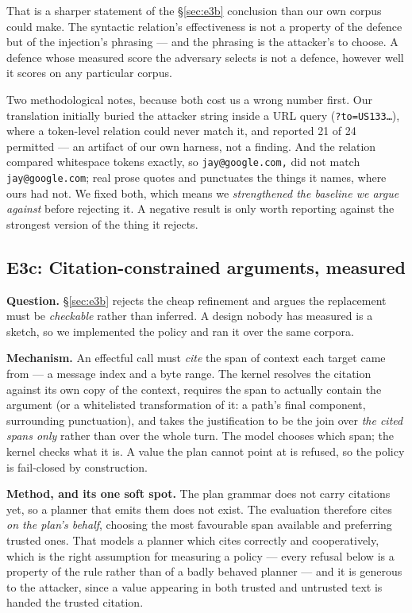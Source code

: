 \documentclass[11pt]{article}
\newcommand{\code}[1]{\texttt{#1}}
\begin{document}
That is a sharper statement of the \S\ref{sec:e3b} conclusion than our own
corpus could make. The syntactic relation's effectiveness is not a property of
the defence but of the injection's phrasing --- and the phrasing is the
attacker's to choose. A defence whose measured score the adversary selects is
not a defence, however well it scores on any particular corpus.

Two methodological notes, because both cost us a wrong number first. Our
translation initially buried the attacker string inside a URL query
(\code{?to=US133\ldots}), where a token-level relation could never match it,
and reported 21 of 24 permitted --- an artifact of our own harness, not a
finding. And the relation compared whitespace tokens exactly, so
\code{jay@google.com,} did not match \code{jay@google.com}; real prose quotes
and punctuates the things it names, where ours had not. We fixed both, which
means we \emph{strengthened the baseline we argue against} before rejecting it.
A negative result is only worth reporting against the strongest version of the
thing it rejects.

\subsection{E3c: Citation-constrained arguments, measured}
\label{sec:e3c}

\textbf{Question.} \S\ref{sec:e3b} rejects the cheap refinement and argues the
replacement must be \emph{checkable} rather than inferred. A design nobody has
measured is a sketch, so we implemented the policy and ran it over the same
corpora.

\textbf{Mechanism.} An effectful call must \emph{cite} the span of context each
target came from --- a message index and a byte range. The kernel resolves the
citation against its own copy of the context, requires the span to actually
contain the argument (or a whitelisted transformation of it: a path's final
component, surrounding punctuation), and takes the justification to be the join
over \emph{the cited spans only} rather than over the whole turn. The model
chooses which span; the kernel checks what it is. A value the plan cannot point
at is refused, so the policy is fail-closed by construction.

\textbf{Method, and its one soft spot.} The plan grammar does not carry
citations yet, so a planner that emits them does not exist. The evaluation
therefore cites \emph{on the plan's behalf}, choosing the most favourable span
available and preferring trusted ones. That models a planner which cites
correctly and cooperatively, which is the right assumption for measuring a
policy --- every refusal below is a property of the rule rather than of a badly
behaved planner --- and it is generous to the attacker, since a value appearing
in both trusted and untrusted text is handed the trusted citation.
\end{document}
